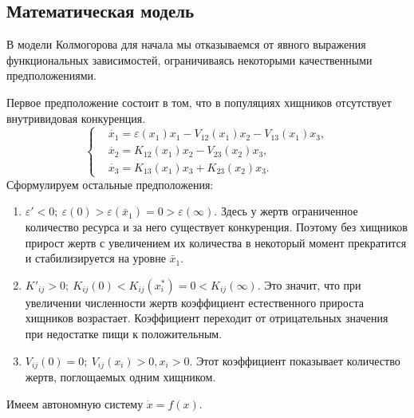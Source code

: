 \subsection{Математическая модель}
    В модели Колмогорова для начала мы отказываемся от явного выражения функциональных зависимостей, ограничиваясь некоторыми качественными предположениями.

    Первое предположение состоит в том, что в популяциях хищников отсутствует внутривидовая конкуренция. 
    \[
        \left\{\begin{split}
            & \dot{x_1} = \varepsilon(x_1)x_1 - V_{12}(x_1)x_2 - V_{13}(x_1)x_3, \\
            & \dot{x_2} = K_{12}(x_1)x_2 - V_{23}(x_2)x_3, \\
            & \dot{x_3} = K_{13}(x_1)x_3 + K_{23}(x_2)x_3. 
        \end{split}\right.
    \]
    Сформулируем остальные предположения:
    \begin{enumerate}
        \item \( \varepsilon' < 0; ~ \varepsilon(0) > \varepsilon(\bar{x}_1) = 0 > \varepsilon(\infty)\). Здесь у жертв ограниченное количество ресурса и за него существует конкуренция. Поэтому без хищников прирост жертв с увеличением их количества в некоторый момент прекратится и стабилизируется на уровне \( \bar{x}_1 \).
        \item \( K'_{ij} > 0; ~ K_{ij}(0) < K_{ij}(x_i^*) = 0 < K_{ij} (\infty) \). Это значит, что при увеличении численности жертв коэффициент естественного прироста хищников возрастает. Коэффициент переходит от отрицательных значения при недостатке пищи к положительным.
        \item \( V_{ij}(0) = 0; ~ V_{ij} (x_i) > 0, x_i > 0 \). Этот коэффициент показывает количество жертв, поглощаемых одним хищником.
    \end{enumerate}

    
    Имеем автономную систему \( \dot{x} = f(x) \).